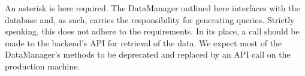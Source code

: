 \documentclass{article}
\begin{document}
An asterisk is here required. The DataManager outlined here  
interfaces with the database and, as such, carries the responsibility for 
generating queries. Strictly speaking, this does not adhere to the requirements. 
In its place, a call should be made to the backend's API for retrieval
of the data. We expect most of the DataManager's methods to be deprecated 
and replaced by an API call on the production machine.
\end{document}
